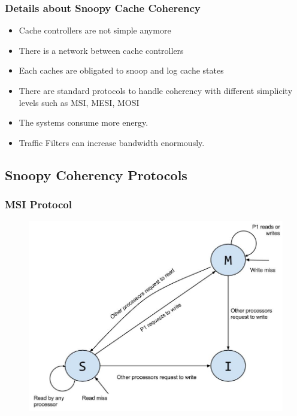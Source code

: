 \documentclass{beamer}
\begin{document}
\begin{frame}
	\frametitle{Details about Snoopy Cache Coherency}
	\begin{itemize}
		\item Cache controllers are not simple anymore
		\item There is a network between cache controllers
		\item Each caches are obligated to snoop and log cache states
		\item There are standard protocols to handle coherency with different simplicity levels such as MSI, MESI, MOSI
		\item The systems consume more energy.
		\item Traffic Filters can increase bandwidth enormously.
	\end{itemize}
\end{frame}

\subsection{Snoopy Coherency Protocols}
\begin{frame}[plain]
	\frametitle{MSI Protocol}
		\begin{figure}
			\includegraphics[width=1\linewidth]{img/MSIstatediagram.jpg}
		\end{figure}
\end{frame}

\end{document}

